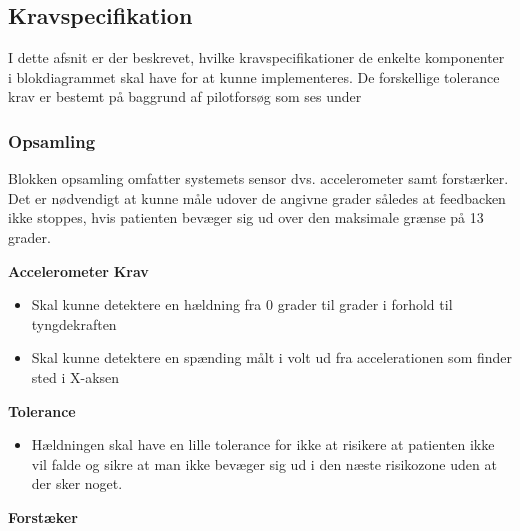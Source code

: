 \subsection{Kravspecifikation}
I dette afsnit er der beskrevet, hvilke kravspecifikationer de enkelte komponenter i blokdiagrammet skal have for at kunne implementeres. De forskellige tolerance krav er bestemt på baggrund af pilotforsøg som ses under 

\subsubsection{Opsamling}
Blokken opsamling omfatter systemets sensor dvs. accelerometer samt forstærker. Det er nødvendigt at kunne måle udover de angivne grader således at feedbacken ikke stoppes, hvis patienten bevæger sig ud over den maksimale grænse på 13 grader.

\textbf{Accelerometer}
\textbf{Krav}
\begin{itemize}
\item Skal kunne detektere en hældning fra 0 grader til  grader i forhold til tyngdekraften
\item Skal kunne detektere en spænding målt i volt ud fra accelerationen som finder sted i X-aksen
\end{itemize}

\textbf{Tolerance}
\begin{itemize}
Tolerance krav vil blive beskrevet på baggrund af pilotforsøg.
\item Hældningen skal have en lille tolerance for ikke at risikere at patienten ikke vil falde og sikre at man ikke bevæger sig ud i den næste risikozone uden at der sker noget.
\end{itemize}

\sub
\textbf{Forstæker}
